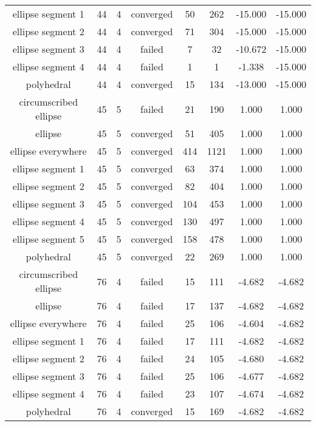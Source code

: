 \begin{scriptsize}
\begin{center}
\begin{longtable}{ c c c c c c c c }
    ellipse segment 1     &   44  &  4  & converged  &   50  &  262  &  -15.000   &  -15.000   \\
    ellipse segment 2     &   44  &  4  & converged  &   71  &  304  &  -15.000   &  -15.000   \\
    ellipse segment 3     &   44  &  4  &   failed   &   7   &   32  &  -10.672   &  -15.000   \\
    ellipse segment 4     &   44  &  4  &   failed   &   1   &   1   &   -1.338   &  -15.000   \\
        polyhedral        &   44  &  4  & converged  &   15  &  134  &  -13.000   &  -15.000   \\
  circumscribed ellipse   &   45  &  5  &   failed   &   21  &  190  &   1.000    &   1.000    \\
         ellipse          &   45  &  5  & converged  &   51  &  405  &   1.000    &   1.000    \\
    ellipse everywhere    &   45  &  5  & converged  &  414  &  1121 &   1.000    &   1.000    \\
    ellipse segment 1     &   45  &  5  & converged  &   63  &  374  &   1.000    &   1.000    \\
    ellipse segment 2     &   45  &  5  & converged  &   82  &  404  &   1.000    &   1.000    \\
    ellipse segment 3     &   45  &  5  & converged  &  104  &  453  &   1.000    &   1.000    \\
    ellipse segment 4     &   45  &  5  & converged  &  130  &  497  &   1.000    &   1.000    \\
    ellipse segment 5     &   45  &  5  & converged  &  158  &  478  &   1.000    &   1.000    \\
        polyhedral        &   45  &  5  & converged  &   22  &  269  &   1.000    &   1.000    \\
  circumscribed ellipse   &   76  &  4  &   failed   &   15  &  111  &   -4.682   &   -4.682   \\
         ellipse          &   76  &  4  &   failed   &   17  &  137  &   -4.682   &   -4.682   \\
    ellipse everywhere    &   76  &  4  &   failed   &   25  &  106  &   -4.604   &   -4.682   \\
    ellipse segment 1     &   76  &  4  &   failed   &   17  &  111  &   -4.682   &   -4.682   \\
    ellipse segment 2     &   76  &  4  &   failed   &   24  &  105  &   -4.680   &   -4.682   \\
    ellipse segment 3     &   76  &  4  &   failed   &   25  &  106  &   -4.677   &   -4.682   \\
    ellipse segment 4     &   76  &  4  &   failed   &   23  &  107  &   -4.674   &   -4.682   \\
        polyhedral        &   76  &  4  & converged  &   15  &  169  &   -4.682   &   -4.682
\end{longtable}
\end{center}
\end{scriptsize}



